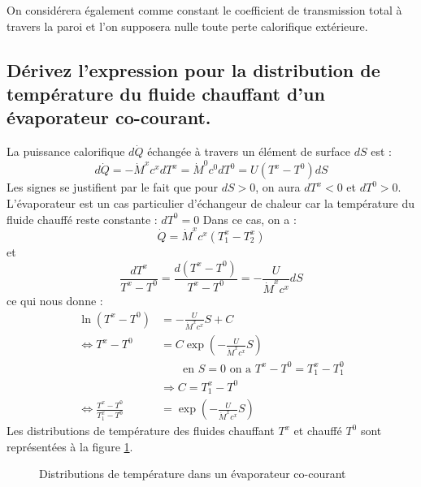 On considérera également comme constant le coefficient de transmission total à travers la paroi et l'on supposera nulle toute perte calorifique extérieure.

\subsection{Dérivez l'expression pour la distribution de température du fluide chauffant d'un évaporateur co-courant.}
La puissance calorifique $d\dot{Q}$ échangée à travers un élément de surface $dS$ est :
\begin{equation} d\dot{Q} = -\dot{M}^xc^xdT^x = \dot{M}^0c^0dT^0 = U(T^x-T^0)dS \end{equation}
Les signes se justifient par le fait que pour $dS > 0$, on aura $dT^x < 0$ et $dT^0 > 0$. L'évaporateur est un cas particulier d'échangeur de chaleur car la température du fluide chauffé reste constante : $dT^0 = 0$
Dans ce cas, on a :
\begin{equation} \dot{Q} = \dot{M}^xc^x(T_1^x - T_2^x) \end{equation}
et
\begin{equation} \frac{dT^x}{T^x-T^0} = \frac{d(T^x-T^0)}{T^x-T^0} = -\frac{U}{\dot{M}^xc^x}dS \end{equation}
ce qui nous donne :
\begin{align} \ln({T^x-T^0}) &= -\frac{U}{\dot{M}^xc^x}S + C\\
			\Leftrightarrow T^x-T^0 &= C\exp\left(-\frac{U}{\dot{M}^xc^x}S\right) \\
			& \qquad\text{en } S = 0 \text{ on a } T^x-T^0 = T_1^x-T_1^0 \\
			&\Rightarrow C = T_1^x-T^0 \\
			\Leftrightarrow\frac{T^x-T^0}{T_1^x-T^0} &= \exp\left(-\frac{U}{\dot{M}^xc^x}S\right)
\end{align}
Les distributions de température des fluides chauffant $T^x$ et chauffé $T^0$ sont représentées à la figure \ref{fig:q3_9}.
\begin{figure}[p]\centering
    \caption{Distributions de température dans un évaporateur co-courant}
    \label{fig:q3_9}
\end{figure}

